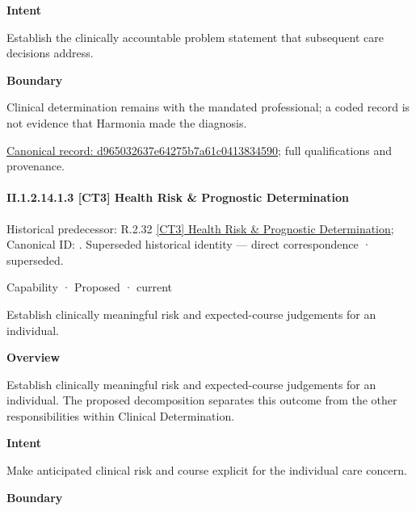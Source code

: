 \textbf{Intent}



Establish the clinically accountable problem statement that subsequent care decisions address.



\textbf{Boundary}



Clinical determination remains with the mandated professional; a coded record is not evidence that Harmonia made the diagnosis.


{\footnotesize \href{../../../../../../../continuum/strategy/capability/d965032637e64275b7a61c0413834590.md}{Canonical record: d965032637e64275b7a61c0413834590}; full qualifications and provenance.}\par
\paragraph*{II.1.2.14.1.3 [CT3] Health Risk \& Prognostic Determination}
\label{navigation:II.1.2.14.1.3}

{\small Historical predecessor: R.2.32 \hyperref[element:3215f0b0e1ce45e8ab16dae272ea6fe7]{[CT3] Health Risk \& Prognostic Determination}; Canonical ID: \texttt{}. Superseded historical identity — direct correspondence · superseded.}\par
\label{element:5bba0ea969814b5fa7ad11b67ab40a0c}
{\small Capability · Proposed · current}\par

Establish clinically meaningful risk and expected-course judgements for an individual.



\textbf{Overview}



Establish clinically meaningful risk and expected-course judgements for an individual. The proposed decomposition separates this outcome from the other responsibilities within Clinical Determination.



\textbf{Intent}



Make anticipated clinical risk and course explicit for the individual care concern.



\textbf{Boundary}



